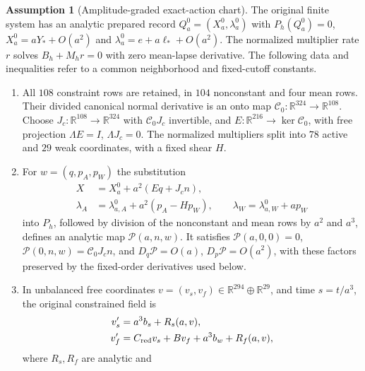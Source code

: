 \documentclass[11pt]{article}
\numberwithin{equation}{section}
\theoremstyle{definition}
\newtheorem{assumption}[assumption]{Assumption}
\theoremstyle{remark}
\begin{document}
\begin{assumption}[Amplitude-graded exact-action chart]
\label{ass:supp-graded-exact-chart}
The original finite system has an analytic prepared record
$Q_a^0=(X_a^0,\lambda_a^0)$ with $P_h(Q_a^0)=0$,
$X_a^0=aY_*+O(a^2)$ and $\lambda_a^0=e+a\ell_*+O(a^2)$.
The normalized multiplier rate $r$ solves
$B_h+M_hr=0$ with zero mean-lapse derivative. The following data and
inequalities refer to a common neighborhood and fixed-cutoff constants.
\begin{enumerate}[label=\textup{(C\arabic*)},leftmargin=3em]
\item All $108$ constraint rows are retained, in $104$ nonconstant and four
mean rows. Their divided canonical normal derivative is an onto map
$\mathcal C_0:\mathbb R^{324}\to\mathbb R^{108}$. Choose
$J_c:\mathbb R^{108}\to\mathbb R^{324}$ with $\mathcal C_0J_c$ invertible,
and $E:\mathbb R^{216}\to\ker\mathcal C_0$, with free projection
$\Lambda E=I$, $\Lambda J_c=0$. The normalized multipliers split into
$78$ active and $29$ weak coordinates, with a fixed shear $H$.
\item For $w=(q,p_A,p_W)$ the substitution
\begin{equation}
 \begin{split}
 X&=X_a^0+a^2(Eq+J_c n),\\
 \lambda_A&=\lambda_{a,A}^0+a^2(p_A-Hp_W),\qquad
 \lambda_W=\lambda_{a,W}^0+ap_W
 \end{split}
 \label{eq:supp-exact-normal-chart}
\end{equation}
into $P_h$, followed by division of the nonconstant and mean rows by $a^2$
and $a^3$, defines an analytic map $\mathcal P(a,n,w)$. It satisfies
$\mathcal P(a,0,0)=0$, $\mathcal P(0,n,w)=\mathcal C_0J_cn$,
and $D_q\mathcal P=O(a)$, $D_p\mathcal P=O(a^2)$, with these factors
preserved by the fixed-order derivatives used below.
\item In unbalanced free coordinates $v=(v_s,v_f)\in\mathbb R^{294}
\oplus\mathbb R^{29}$, and time $s=t/a^3$, the original constrained field is
\begin{equation}
 \begin{split}
 v_s'&=a^3b_s+R_s(a,v),\\
 v_f'&=C_{\rm red}v_s+Bv_f+a^3b_w+R_f(a,v),
 \end{split}
 \label{eq:supp-exact-unbalanced-field}
\end{equation}
where $R_s,R_f$ are analytic and
\begin{equation}
 \begin{aligned}

\end{aligned}
\end{equation}
\end{enumerate}
\end{assumption}
\end{document}
